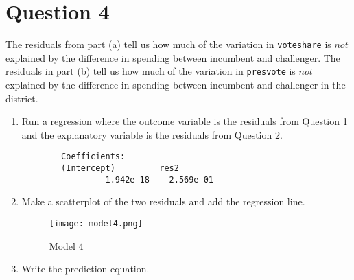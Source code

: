 \documentclass[12pt,letterpaper]{article}
\begin{document}
\section*{Question 4}
\noindent The residuals from part (a) tell us how much of the variation in \texttt{voteshare} is $not$ explained by the difference in spending between incumbent and challenger. The residuals in part (b) tell us how much of the variation in \texttt{presvote} is $not$ explained by the difference in spending between incumbent and challenger in the district.
	\begin{enumerate}
		\item Run a regression where the outcome variable is the residuals from Question 1 and the explanatory variable is the residuals from Question 2.	
		 
		\begin{verbatim}
		Coefficients:
		(Intercept)         res2  
				-1.942e-18    2.569e-01  
		\end{verbatim}
		\vspace{2cm}
		\item Make a scatterplot of the two residuals and add the regression line. 	
		 
		\begin{figure}[h!]
			\caption{\footnotesize{Model 4}}
			\vspace{.5cm}
			\centering
			\label{fig:Model 4}			
			\texttt{[image: model4.png]}
		\end{figure}		
		\vspace{2cm}
		\item Write the prediction equation.
		 
	\end{enumerate}
	
	\newpage	
\end{document}
